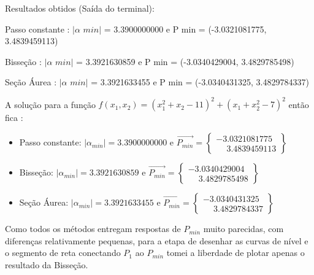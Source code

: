 \documentclass[10pt, a4paper]{article}
\begin{document}
Resultados obtidos (Saída do terminal):
\newline


Passo constante : $|\alpha \,\, min|$ = 3.3900000000 e P min = (-3.0321081775, 3.4839459113)

Bisseção        : $|\alpha \,\, min|$ = 3.3921630859 e P min = (-3.0340429004, 3.4829785498)

Seção Áurea     : $|\alpha \,\,  min|$ = 3.3921633455 e P min = (-3.0340431325, 3.4829784337)

A solução para a função $f(x_1, x_2) = (x_1^2 + x_2 - 11)^2 + (x_1 + x_2^2 - 7)^2$ então fica :
\newline

\begin{itemize}
  \item Passo constante: $|\alpha_{min}| = 3.3900000000$ e $\overrightarrow{P_{min}} =  
  \begin{Bmatrix}
    -3.0321081775 \\ \phantom{-}3.4839459113
  \end{Bmatrix}$
  \item Bisseção: $|\alpha_{min}| = 3.3921630859$ e $\overrightarrow{P_{min}} =  
  \begin{Bmatrix}
    -3.0340429004 \\ \phantom{-}3.4829785498
  \end{Bmatrix}$
  \item Seção Áurea: $|\alpha_{min}| = 3.3921633455$ e $\overrightarrow{P_{min}} =  
  \begin{Bmatrix}
    -3.0340431325 \\ \phantom{-}3.4829784337
  \end{Bmatrix}$
\end{itemize}

Como todos os métodos entregam respostas de $P_{min}$ muito parecidas, com diferenças relativamente pequenas,
para a etapa de desenhar as curvas de nível e o segmento de reta conectando $P_1$ ao $P_{min}$ tomei a liberdade
de plotar apenas o resultado da Bisseção.
\end{document}
